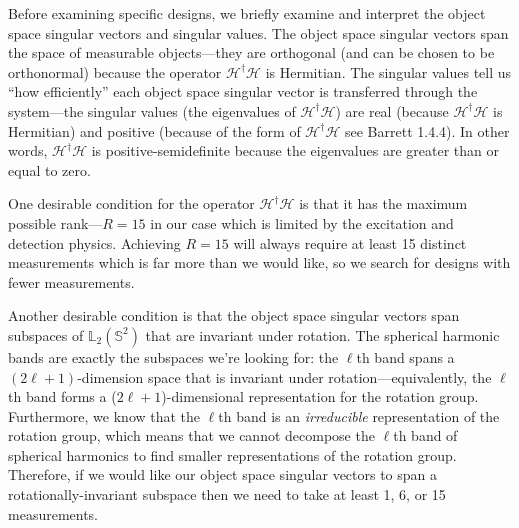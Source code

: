 \documentclass[11pt]{article}
\providecommand{\mc}[1]{\mathcal{#1}}
\providecommand{\mbb}[1]{\mathbb{#1}}
\begin{document}
Before examining specific designs, we briefly examine and interpret the object
space singular vectors and singular values. The object space singular vectors
span the space of measurable objects---they are orthogonal (and can be chosen to
be orthonormal) because the operator $\mc{H}^\dagger\mc{H}$ is Hermitian. The
singular values tell us ``how efficiently'' each object space singular vector is
transferred through the system---the singular values (the eigenvalues of
$\mc{H}^\dagger\mc{H}$) are real (because $\mc{H}^\dagger\mc{H}$ is Hermitian)
and positive (because of the form of $\mc{H}^\dagger\mc{H}$ see Barrett 1.4.4).
In other words, $\mc{H}^\dagger\mc{H}$ is positive-semidefinite because the
eigenvalues are greater than or equal to zero.

One desirable condition for the operator $\mc{H}^\dagger\mc{H}$ is that it has
the maximum possible rank---$R=15$ in our case which is limited by the
excitation and detection physics. Achieving $R=15$ will always require at least
15 distinct measurements which is far more than we would like, so we search for
designs with fewer measurements.

Another desirable condition is that the object space singular vectors span
subspaces of $\mbb{L}_2(\mbb{S}^2)$ that are invariant under rotation. The
spherical harmonic bands are exactly the subspaces we're looking for: the
$\ell$th band spans a $(2\ell + 1)$-dimension space that is invariant under
rotation---equivalently, the $\ell$th band forms a ($2\ell +1$)-dimensional
representation for the rotation group. Furthermore, we know that the $\ell$th
band is an \textit{irreducible} representation of the rotation group, which
means that we cannot decompose the $\ell$th band of spherical harmonics to find
smaller representations of the rotation group. Therefore, if we would like our
object space singular vectors to span a rotationally-invariant subspace then we
need to take at least 1, 6, or 15 measurements.

\end{document}
